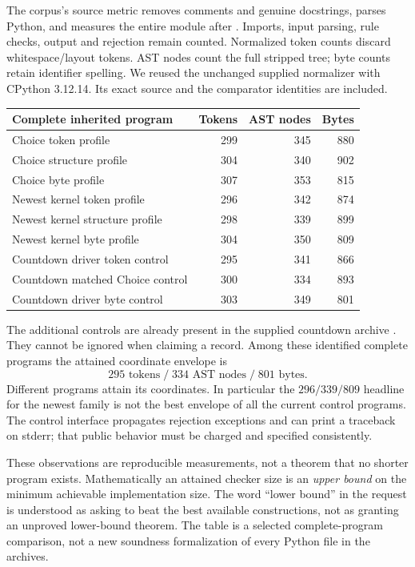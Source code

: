 \documentclass[11pt]{article}
\theoremstyle{definition}
\newcommand{\file}[1]{\texttt{\small\detokenize{#1}}}
\begin{document}
The corpus's source metric removes comments and genuine docstrings,
parses Python, and measures the entire module after \file{ast.unparse}.
Imports, input parsing, rule checks, output and rejection remain counted.
Normalized token counts discard whitespace/layout tokens. AST nodes count
the full stripped tree; byte counts retain identifier spelling. We reused
the unchanged supplied normalizer with CPython 3.12.14. Its exact source
and the comparator identities are included.

\begin{center}
\small
\begin{tabular}{lrrr}
\toprule
Complete inherited program & Tokens & AST nodes & Bytes\\
\midrule
Choice token profile &299&345&880\\
Choice structure profile &304&340&902\\
Choice byte profile &307&353&815\\
Newest kernel token profile &296&342&874\\
Newest kernel structure profile &298&339&899\\
Newest kernel byte profile &304&350&809\\
Countdown driver token control &295&341&866\\
Countdown matched Choice control &300&334&893\\
Countdown driver byte control &303&349&801\\
\bottomrule
\end{tabular}
\end{center}

The additional controls are already present in the supplied countdown
archive \cite{countdown}. They cannot be ignored when claiming a
record. Among these identified complete programs the attained coordinate
envelope is
\[
 \boxed{295\text{ tokens}\;/\;334\text{ AST nodes}\;/\;801\text{ bytes}.}
\]
Different programs attain its coordinates. In particular the
$296/339/809$ headline for the newest family is not the best envelope
of all the current control programs. The control interface propagates
rejection exceptions and can print a traceback on stderr; that public
behavior must be charged and specified consistently.

These observations are reproducible measurements, not a theorem that no
shorter program exists. Mathematically an attained checker size is an
\emph{upper bound} on the minimum achievable implementation size. The
word ``lower bound'' in the request is understood as asking to beat the
best available constructions, not as granting an unproved lower-bound
theorem. The table is a selected complete-program comparison, not a new
soundness formalization of every Python file in the archives.
\end{document}
